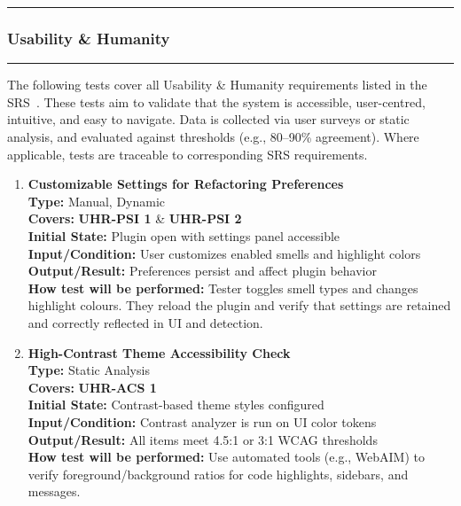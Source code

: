 \documentclass[12pt, titlepage]{article}
\newcommand{\colorrule}{\textcolor{BlueViolet}{\rule{\linewidth}{2pt}}}
\begin{document}
\newpage
\noindent\colorrule

\subsubsection{Usability \& Humanity}
\colorrule

\medskip

\noindent
The following tests cover all Usability \& Humanity requirements listed in the SRS~\cite{SRS}. These tests aim to validate that the system is accessible, user-centred, intuitive, and easy to navigate. Data is collected via user surveys or static analysis, and evaluated against thresholds (e.g., 80–90\% agreement). Where applicable, tests are traceable to corresponding SRS requirements.

\begin{enumerate}[label={\bf \textcolor{Maroon}{test-UH-\arabic*}}, wide=0pt, font=\itshape]

  \item \textbf{Customizable Settings for Refactoring Preferences} \\[2mm]
    \textbf{Type:} Manual, Dynamic \\
    \textbf{Covers:} \textbf{UHR-PSI 1} \& \textbf{UHR-PSI 2} \\ 
    \textbf{Initial State:} Plugin open with settings panel accessible \\
    \textbf{Input/Condition:} User customizes enabled smells and highlight colors \\
    \textbf{Output/Result:} Preferences persist and affect plugin behavior \\[2mm]
    \textbf{How test will be performed:} Tester toggles smell types and changes highlight colours. They reload the plugin and verify that settings are retained and correctly reflected in UI and detection.

  \item \textbf{High-Contrast Theme Accessibility Check} \\[2mm]
    \textbf{Type:} Static Analysis \\
    \textbf{Covers:} \textbf{UHR-ACS 1} \\ 
    \textbf{Initial State:} Contrast-based theme styles configured \\
    \textbf{Input/Condition:} Contrast analyzer is run on UI color tokens \\
    \textbf{Output/Result:} All items meet 4.5:1 or 3:1 WCAG thresholds \\[2mm]
    \textbf{How test will be performed:} Use automated tools (e.g., WebAIM) to verify foreground/background ratios for code highlights, sidebars, and messages.


\end{enumerate}
\end{document}
